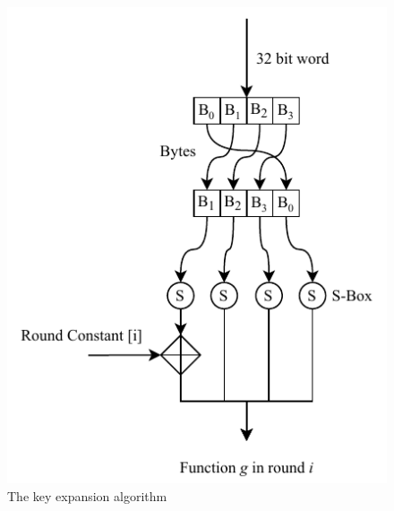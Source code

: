 \begin{figure}
\begin{minipage}{.35\textwidth}
    \includegraphics[width=\linewidth]{data/assets/g_function.pdf}
  \end{minipage}
  \caption{The key expansion algorithm \cite{paar2016kryptografie}}
  \label{fig:keyexpansion}
\end{figure}

